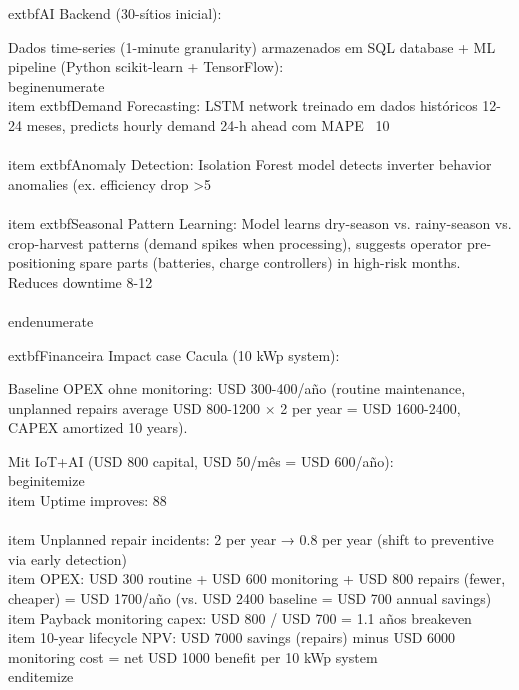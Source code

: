 \documentclass[12pt, a4paper]{article}
\begin{document}
{{{{{{{{{{{{	extbf{AI Backend (30-sítios inicial):}

Dados time-series (1-minute granularity) armazenados em SQL database + ML pipeline (Python scikit-learn + TensorFlow):
\\begin{enumerate}
\\item 	extbf{Demand Forecasting}: LSTM network treinado em dados históricos 12-24 meses, predicts hourly demand 24-h ahead com MAPE ~10\\%

\\item 	extbf{Anomaly Detection}: Isolation Forest model detects inverter behavior anomalies (ex. efficiency drop >5\\%

\\item 	extbf{Seasonal Pattern Learning}: Model learns dry-season vs. rainy-season vs. crop-harvest patterns (demand spikes when processing), suggests operator pre-positioning spare parts (batteries, charge controllers) in high-risk months. Reduces downtime 8-12\\%
\\end{enumerate}

	extbf{Financeira Impact case Cacula (10 kWp system):}

Baseline OPEX ohne monitoring: USD 300-400/año (routine maintenance, unplanned repairs average USD 800-1200 × 2 per year = USD 1600-2400, CAPEX amortized 10 years). 

Mit IoT+AI (USD 800 capital, USD 50/mês = USD 600/año):
\\begin{itemize}
\\item Uptime improves: 88\\%
\\item Unplanned repair incidents: 2 per year → 0.8 per year (shift to preventive via early detection)
\\item OPEX: USD 300 routine + USD 600 monitoring + USD 800 repairs (fewer, cheaper) = USD 1700/año (vs. USD 2400 baseline = USD 700 annual savings)
\\item Payback monitoring capex: USD 800 / USD 700 = 1.1 años breakeven
\\item 10-year lifecycle NPV: USD 7000 savings (repairs) minus USD 6000 monitoring cost = net USD 1000 benefit per 10 kWp system
\\end{itemize}

}}}}}}}}}}}}
\end{document}
